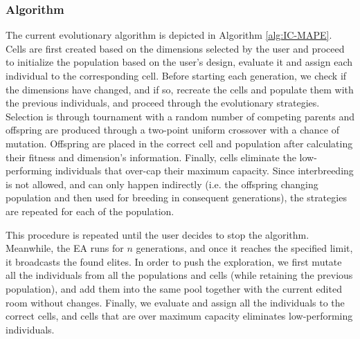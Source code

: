 \documentclass[conference]{IEEEtran}
\begin{document}
\subsubsection{Algorithm}

The current evolutionary algorithm is depicted in Algorithm \ref{alg:IC-MAPE}. Cells are first created based on the dimensions selected by the user and proceed to initialize the population based on the user's design, evaluate it and assign each individual to the corresponding cell. Before starting each generation, we check if the dimensions have changed, and if so, recreate the cells and populate them with the previous individuals, and proceed through the evolutionary strategies. Selection is through tournament with a random number of competing parents and offspring are produced through a two-point uniform crossover with a chance of mutation. Offspring are placed in the correct cell and population after calculating their fitness and dimension's information. Finally, cells eliminate the low-performing individuals that over-cap their maximum capacity. Since interbreeding is not allowed, and can only happen indirectly (i.e. the offspring changing population and then used for breeding in consequent generations), the strategies are repeated for each of the population.

This procedure is repeated until the user decides to stop the algorithm. Meanwhile, the EA runs for $n$ generations, and once it reaches the specified limit, it broadcasts the found elites. In order to push the exploration, we first mutate all the individuals from all the populations and cells (while retaining the previous population), and add them into the same pool together with the current edited room without changes. Finally, we evaluate and assign all the individuals to the correct cells, and cells that are over maximum capacity eliminates low-performing individuals.


\end{document}
